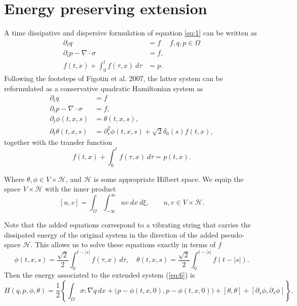 \documentclass[12pt]{article}
\begin{document}
\section{Energy preserving extension}
A time dissipative and dispersive formulation of equation \ref{eq:1} can be written as
\begin{equation} \label{eq:5}
\begin{aligned}
	\partial_{t} q &= f & f,q,p \in \Omega \\
	\partial_{t} p -\nabla\cdot \sigma &= f,\\
	f(t,x) + \int_{0}^t f(\tau,x) \ d\tau &= p.
\end{aligned}
\end{equation}
Following the footsteps of Figotin et al. 2007, the latter system can be reformulated as a conservative quadratic Hamiltonian system as
\begin{equation} \label{eq:6}
\begin{aligned}
	\partial_{t} q &= f\\
	\partial_{t} p -\nabla\cdot \sigma &= f,\\
	\partial_{t} \phi(t,x,s) &= \theta(t,x,s), \\
	\partial_{t} \theta(t,x,s) &= \partial_{s}^2 \phi(t,x,s) + \sqrt 2 \delta_{0}(s)f(t,x),
\end{aligned}
\end{equation}
together with the transfer function
\begin{equation} \label{eq:7}
	f(t,x) + \int_{0}^t f(\tau,x) \ d\tau = p(t,x).
\end{equation}

Where $\theta,\phi\in V\times \mathcal{H}$, and $\mathcal H$ is some appropriate Hilbert space. We equip the space $V\times \mathcal{H}$ with the inner product
\begin{equation} \label{eq:8}
	[u,v] = \int_{\Omega} \int_{-\infty}^{\infty} uv\ dx \ d \xi, \qquad u,v \in V\times \mathcal{H}.
\end{equation}

Note that the added equations correspond to a vibrating string that carries the dissipated energy of the original system in the direction of the added pseudo-space $\mathcal H$. This allows us to solve these equations exactly in terms of $f$
\begin{equation} \label{eq:9}
	\phi(t,x,s) = \frac{\sqrt 2}{2} \int_{0}^{t-|s|} f(\tau,x) \ d\tau, \quad \theta(t,x,s) = \frac{\sqrt 2}{2} \int_{0}^{t-|s|} f(t - |s|).
\end{equation}
Then the energy associated to the extended system (\ref{eq:6}) is
\begin{equation}
	H(q,p,\phi,\theta) = \frac 1 2 \left\{ \int_{\Omega} \sigma:\nabla q \ dx + \big(p-\phi(t,x,0),p - \phi(t,x,0)\big) + [\theta,\theta] + [\partial_s \phi , \partial_s \phi]  \right\}.
\end{equation}
\end{document}
